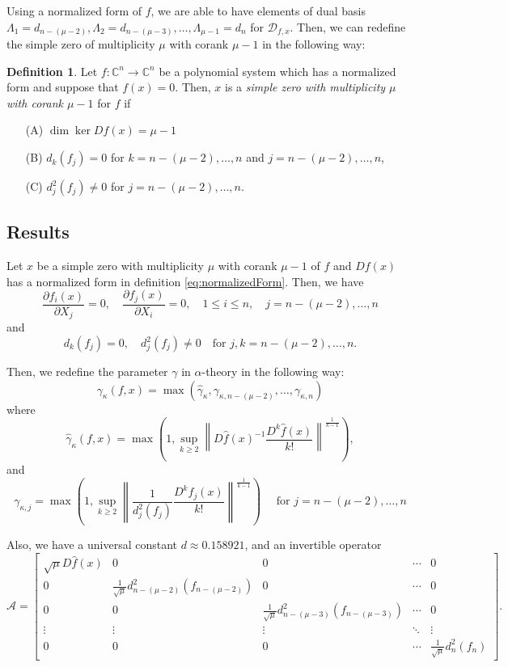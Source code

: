 \documentclass[12pt,oneside,reqno]{amsart}
\theoremstyle{definition}
\newtheorem{defi}[thm]{Definition}
\begin{document}
Using a normalized form of $f$, we are able to have elements of dual basis $\Lambda_1=d_{n-(\mu-2)},\Lambda_2=d_{n-(\mu-3)},\dots,\Lambda_{\mu-1}=d_n$ for $\mathcal{D}_{f,x}$. Then, we can redefine the simple zero of multiplicity $\mu$ with corank $\mu-1$ in the following way:
\begin{defi}
 Let $f:\mathbb{C}^n\rightarrow\mathbb{C}^n$ be a polynomial system which has a normalized form and suppose that $f(x)=0$. Then, $x$ is a {\it simple zero with multiplicity $\mu$ with corank $\mu-1$} for $f$ if
 \begin{itemize}
 	\item[(A)] $\dim\ker Df(x)=\mu -1$
 	\item[(B)] $d_k(f_j)=0$ for $k=n-(\mu-2),\dots,n$ and $j=n-(\mu-2),\dots,n$,
 	\item[(C)] $d_{j}^2(f_{j})\ne0$ for $j=n-(\mu-2),\dots, n$.
 	\end{itemize}
	
\end{defi}


\subsection{Results}
Let $x$ be a simple zero with multiplicity $\mu$ with corank $\mu-1$ of $f$ and $Df(x)$ has a normalized form in definition \ref{eq:normalizedForm}. Then, we have 
\[\frac{\partial f_i(x)}{\partial X_j}=0,\quad \frac{\partial f_j(x)}{\partial X_i}=0, \quad 1\leq i\leq n,\quad j=n-(\mu-2),\dots,n\]
and
\[d_k(f_j)=0,\quad d_j^2(f_j)\ne 0\quad \text{for }j,k=n-(\mu-2),\dots,n.\]

Then, we redefine the parameter $\gamma$ in $\alpha$-theory in the following way:
$$\gamma_{\kappa}(f,x)=\max(\hat{\gamma}_{\kappa},\gamma_{\kappa,n-(\mu -2)},\dots,\gamma_{\kappa,n})$$
where
\[\hat{\gamma}_{\kappa}(f,x)=\max\left(1,\sup\limits_{k\geq 2}\left\|D\hat{f}(x)^{-1}\frac{D^k\hat{f}(x)}{k!}\right\|^{\frac{1}{k-1}}\right),\]
and
\[\gamma_{\kappa,j}=\max\left(1,\sup\limits_{k\geq 2}\left\|\frac{1}{d_j^2(f_j)}\frac{D^k f_j(x)}{k!}\right\|^{\frac{1}{k-1}}\right)\quad \text{ for } j=n-(\mu-2),\dots,n\]


Also, we have a universal constant $d\approx 0.158921$, and an invertible operator 
\[\mathcal{A}=\begin{bmatrix}
\sqrt{\mu}D\hat{f}(x) & 0 & 0 & \cdots & 0\\
0 & \frac{1}{\sqrt{\mu}}d_{n-(\mu-2)}^2(f_{n-(\mu-2)}) &0 & \cdots & 0 \\
0 & 0 & \frac{1}{\sqrt{\mu}}d_{n-(\mu-3)}^2(f_{n-(\mu-3)}) & \cdots & 0 \\
\vdots & \vdots & \vdots & \ddots & \vdots \\
0 & 0 & 0 & \cdots &\frac{1}{\sqrt{\mu}}d_{n}^2(f_{n})
\end{bmatrix}.\]
\end{document}
